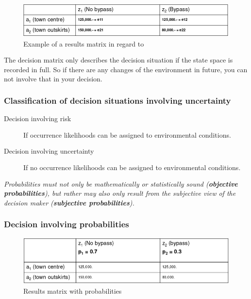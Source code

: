 \begin{figure}[H]
\centering
\includegraphics[width=\textwidth]{figures/resultMatrix.png}
\caption{Example of a results matrix in regard to
}
\end{figure}

The decision matrix only describes the decision situation if the state
space is recorded in full. So if there are any changes of the environment in
future, you can not involve that in your decision.

\subsubsection{Classification of decision situations involving uncertainty}

\begin{description}
	\item[Decision involving risk] If occurrence likelihoods can be
	assigned to environmental conditions.
	\item[Decision involving uncertainty] If no occurrence likelihoods can be
	assigned to environmental conditions.
\end{description}

\emph{Probabilities must not only be mathematically or statistically
sound (\textbf{objective probabilities}), but rather may also only result from
the subjective view of the decision maker (\textbf{subjective probabilities}).}

\subsubsection{Decision involving probabilities}

\begin{figure}[H]
\centering
\includegraphics[width=\textwidth]{figures/resultMatrix2.png}
\caption{Results matrix with probabilities}
\end{figure}


